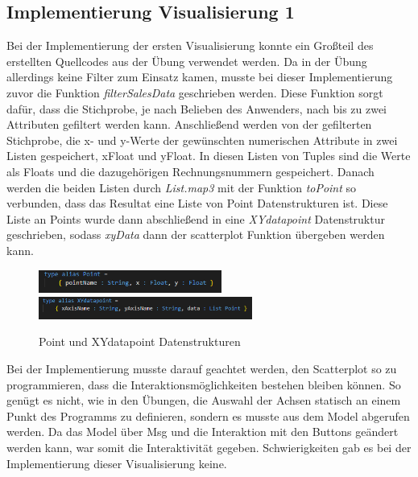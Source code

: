 \documentclass[usegeometry=true]{scrartcl}
\begin{document}
\subsection{Implementierung Visualisierung 1}\label{Implementierung1}
Bei der Implementierung der ersten Visualisierung konnte ein Großteil des erstellten Quellcodes aus der Übung verwendet werden. Da in der Übung allerdings keine Filter zum
Einsatz kamen, musste bei dieser Implementierung zuvor die Funktion \textit{filterSalesData} geschrieben werden. Diese Funktion sorgt dafür, dass die Stichprobe, je nach
Belieben des Anwenders, nach bis zu zwei Attributen gefiltert werden kann. Anschließend werden von der gefilterten Stichprobe, die x- und y-Werte der gewünschten numerischen
Attribute in zwei Listen gespeichert, xFloat und yFloat. In diesen Listen von Tuples sind die Werte als Floats und die dazugehörigen Rechnungsnummern gespeichert. Danach
werden die beiden Listen durch \textit{List.map3} mit der Funktion \textit{toPoint} so verbunden, dass das Resultat eine Liste von Point Datenstrukturen ist. Diese Liste an
Points wurde dann abschließend in eine \textit{XYdatapoint} Datenstruktur geschrieben, sodass \textit{xyData} dann der scatterplot Funktion übergeben werden kann.

\begin{figure} [H]
	\begin{center}
		\includegraphics[width=6cm]{IMG/PointDatenstruktur}
		\includegraphics[width=7cm]{IMG/XYdatapoint}
		\caption{Point und XYdatapoint Datenstrukturen}
		\label{fig:Point_XYdatapoint}
	\end{center}
\end{figure}

\noindent Bei der Implementierung musste darauf geachtet werden, den Scatterplot so zu programmieren, dass die Interaktionsmöglichkeiten bestehen bleiben können.
So genügt es nicht, wie in den Übungen, die Auswahl der Achsen statisch an einem Punkt des Programms zu definieren, sondern es musste aus dem Model abgerufen werden. Da das
Model über Msg und die Interaktion mit den Buttons geändert werden kann, war somit die Interaktivität gegeben. Schwierigkeiten gab es bei der Implementierung dieser
Visualisierung keine.
\end{document}
